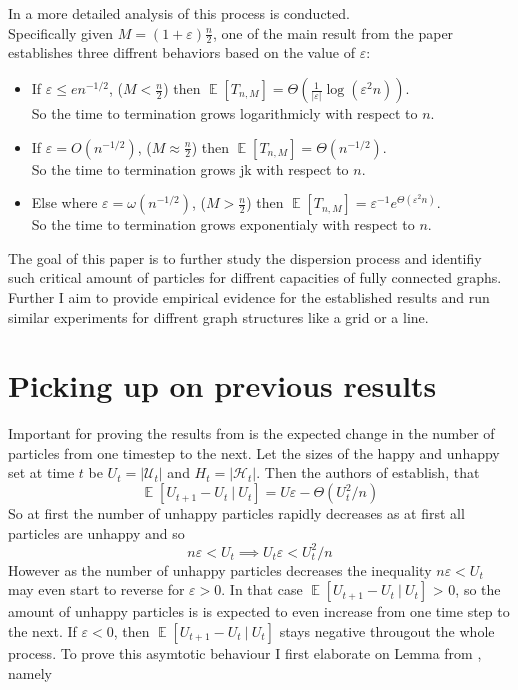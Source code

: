 \documentclass{article}
\DeclareMathOperator{\EX}{\mathbb{E}}%
\newcommand{\Up}[2]{\mathcal{U}_{#1}^{#2}}
\newcommand{\Hp}[2]{\mathcal{H}_{#1}^{#2}}
\begin{document}
\newpage
In \cite{dispersion} a more detailed analysis of this process is conducted.\\
Specifically given $M = (1 + \varepsilon)\frac{n}{2}$, one of the main result from the paper 
establishes three diffrent behaviors based on the value of $\varepsilon$:
\begin{itemize}
  \item If $\varepsilon \leq e n^{-1/2}$, ($M < \frac{n}{2}$) then $\EX[T_{n,M}] = \Theta(\frac{1}{|\varepsilon|} \log(\varepsilon^{2}n))$.\\
    So the time to termination grows logarithmicly with respect to $n$.
  \item If $\varepsilon = O(n^{-1/2})$, ($M \approx \frac{n}{2}$) then $\EX[T_{n,M}] = \Theta(n^{-1/2})$.\\ 
    So the time to termination grows jk with respect to $n$.
  \item Else where $\varepsilon = \omega(n^{-1/2})$, ($M > \frac{n}{2}$) 
    then $\EX[T_{n,M}] = \varepsilon^{-1} e^{\Theta(\varepsilon^{2}n)}$.\\ 
    So the time to termination grows exponentialy with respect to $n$.
\end{itemize}

The goal of this paper is to further study the dispersion process and identifiy
such critical amount of particles for diffrent capacities of fully connected graphs.
Further I aim to provide empirical evidence for the established results and run similar 
experiments for diffrent graph structures like a grid or a line.

\section{Picking up on previous results}
Important for proving the results from \cite{dispersion} is the expected change in the number of particles from one timestep to the next.
Let the sizes of the happy and unhappy set at time $t$ be $U_t = |\Up{t}{}|$ and $H_t = |\Hp{t}{}|$.
Then the authors of \cite{dispersion} establish, that
\[\EX[U_{t+1} - U_t \ |\ U_t ] = U \varepsilon - \Theta(U_t^2/n)\]
So at first the number of unhappy particles rapidly decreases as at first all particles are unhappy and so   
\[ n \varepsilon < U_t \implies U_t \varepsilon < U_t^2/n\]
However as the number of unhappy particles decreases the inequality $n \varepsilon < U_t$ may even start to reverse
for $\varepsilon > 0$. In that case $\EX[U_{t+1} - U_t \ |\ U_t ]$ > 0, so the amount of unhappy particles is
is expected to even increase from one time step to the next.
If $\varepsilon < 0$, then $\EX[U_{t+1} - U_t \ |\ U_t ]$ stays negative througout 
the whole process.
To prove this asymtotic behaviour I first elaborate on Lemma from \cite{dispersion}, namely
\end{document}
